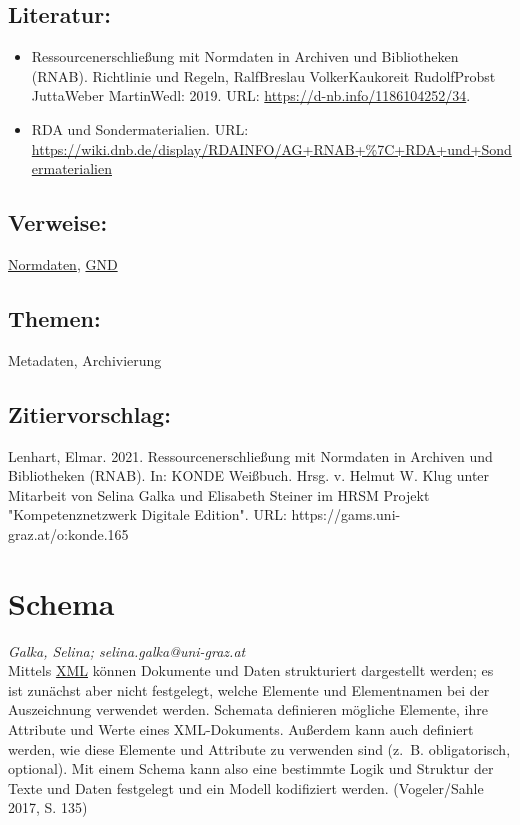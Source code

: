 \documentclass{article}
\begin{document}
        \subsection*{Literatur:}\begin{itemize}\item Ressourcenerschließung mit Normdaten in Archiven und Bibliotheken (RNAB). Richtlinie und Regeln, RalfBreslau VolkerKaukoreit RudolfProbst JuttaWeber MartinWedl: 2019. URL: \url{https://d-nb.info/1186104252/34}.\item RDA und Sondermaterialien. URL: \url{https://wiki.dnb.de/display/RDAINFO/AG+RNAB+%7C+RDA+und+Sondermaterialien}\end{itemize}\subsection*{Verweise:}\href{https://gams.uni-graz.at/o:konde.147}{Normdaten}, \href{https://gams.uni-graz.at/o:konde.109}{GND}\subsection*{Themen:}Metadaten, Archivierung\subsection*{Zitiervorschlag:}Lenhart, Elmar. 2021. Ressourcenerschließung mit Normdaten in Archiven und Bibliotheken (RNAB). In: KONDE Weißbuch. Hrsg. v. Helmut W. Klug unter Mitarbeit von Selina Galka und Elisabeth Steiner im HRSM Projekt "Kompetenznetzwerk Digitale Edition". URL: https://gams.uni-graz.at/o:konde.165\newpage\section*{Schema} \emph{Galka, Selina; selina.galka@uni-graz.at }\\
        
    Mittels \href{http://gams.uni-graz.at/o:konde.215}{XML} können Dokumente und Daten strukturiert dargestellt werden; es ist zunächst aber nicht festgelegt, welche Elemente und Elementnamen bei der Auszeichnung verwendet werden. Schemata definieren mögliche Elemente, ihre Attribute und Werte eines XML-Dokuments. Außerdem kann auch definiert werden, wie diese Elemente und Attribute zu verwenden sind (z. B. obligatorisch, optional). Mit einem Schema kann also eine bestimmte Logik und Struktur der Texte und Daten festgelegt und ein Modell kodifiziert werden. (Vogeler/Sahle 2017, S. 135)\\
            
\end{document}
